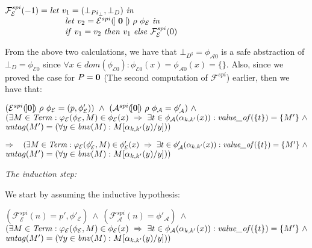 \documentclass[10pt,a4paper,final,oneside,fleqn]{book}
\begin{document}
\noindent
$\mathcal{F}_\mathcal{E}^{spi}(-1)=\mbox{{\itshape let\/} }v_1=(\bot_{Pi_\bot},\bot_{D})\mbox{ {\itshape in\/}}$\\
$\hspace{25mm}\mbox{{\itshape let\/} }v_2=\mathcal{E}^{spi}(\![~{\bf 0}~]\!)~\rho~\phi_\mathcal{E}\mbox{ {\itshape in\/}}$\\
$\hspace{25mm}\mbox{{\itshape if\/} }v_1=v_2\mbox{ {\itshape then\/} }v_1\mbox{ {\itshape else\/} }\mathcal{F}_\mathcal{E}^{spi}(0)$\vspace{5mm}

\noindent
From the above two calculations, we have that $\bot_{D^\sharp}=\phi_{\mathcal{A}0}$ is a safe abstraction of $\bot_{D}=\phi_{\mathcal{E}0}$ since $\forall x\in dom(\phi_{\mathcal{E}0}):\phi_{\mathcal{E}0}(x)=\phi_{\mathcal{A}0}(x)=\{\}$.  Also, since we proved the case for $P={\bf 0}$ (The second computation of $\mathcal{F}^{spi}$) earlier, then we have that:

\noindent

$(\mathcal{E}^{spi}(\![{\bf 0}]\!)~\rho~\phi_\mathcal{E}=(p,\phi'_\mathcal{E}))~\wedge~(\mathcal{A}^{spi}(\![{\bf 0}]\!)~\rho~\phi_\mathcal{A}=\phi'_\mathcal{A})~\wedge$\\
$(\exists M\in\mbox{{\itshape Term\/}}:\varphi_\mathcal{E}(\phi_\mathcal{E},M)\in\phi_\mathcal{E}(x)~\Rightarrow~\exists t\in\phi_\mathcal{A}(\alpha_{k,k'}(x)):\mbox{{\itshape value\_of\/}}(\{t\})=\{M'\}~\wedge$\\
$\mbox{{\itshape untag\/}}(M')=(\forall y\in\mbox{{\itshape bnv\/}}(M):M[\alpha_{k,k'}(y)/y]))$\vspace{5mm}

\noindent
$\Rightarrow~~~(\exists M\in\mbox{{\itshape Term\/}}:\varphi_\mathcal{E}(\phi'_\mathcal{E},M)\in\phi'_\mathcal{E}(x)~\Rightarrow~\exists t\in\phi'_\mathcal{A}(\alpha_{k,k'}(x)): \mbox{{\itshape value\_of\/}}(\{t\})=\{M'\}~\wedge$\\
$\mbox{{\itshape untag\/}}(M')=(\forall y\in\mbox{{\itshape bnv\/}}(M):M[\alpha_{k,k'}(y)/y]))$\vspace{5mm}

\noindent
{\itshape The induction step:\/}\vspace{5mm}

\noindent
We start by assuming the inductive hypothesis:

\noindent
$(\mathcal{F}_\mathcal{E}^{spi}(n)=p',\phi'_\mathcal{E})~\wedge~(\mathcal{F}_\mathcal{A}^{spi}(n)=\phi'_\mathcal{A})~\wedge$\\
$(\exists M\in\mbox{{\itshape Term\/}}:\varphi_\mathcal{E}(\phi_\mathcal{E},M)\in\phi_\mathcal{E}(x)~\Rightarrow~\exists t\in\phi_\mathcal{A}(\alpha_{k,k'}(x)):\mbox{{\itshape value\_of\/}}(\{t\})=\{M'\}~\wedge$\\
$\mbox{{\itshape untag\/}}(M')=(\forall y\in\mbox{{\itshape bnv\/}}(M):M[\alpha_{k,k'}(y)/y]))$\vspace{5mm}
\end{document}
